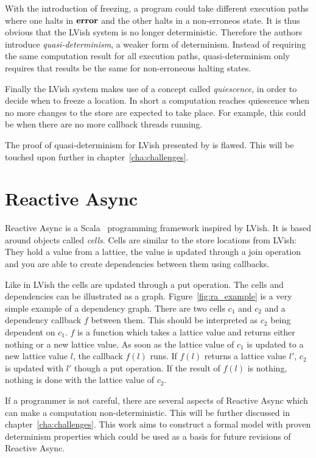 With the introduction of freezing, a program could take different execution
paths where one halts in $\mbox{{\bf error}}$ and the other halts in a non-erroneos state.
It is thus obvious that the LVish system is no longer deterministic. Therefore
the authors introduce \emph{quasi-determinism}, a weaker form of
determinism. Instead of requiring the same computation result for all execution
paths, quasi-determinism only requires that results be the same for
non-erroneous halting states.

Finally the LVish system makes use of a concept called \emph{quiescence}, in
order to decide when to freeze a location. In short a computation reaches
quiescence when no more changes to the store are expected to take place. For
example, this could be when there are no more callback threads running.

The proof of quasi-determinism for LVish presented by
\textcite{kuper2014freezeTR} is flawed. This will be touched upon further in
chapter~\ref{cha:challenges}.


\section{Reactive Async}\label{sec:reactive_async}

Reactive Async is a Scala~\parencite{} programming framework inspired by LVish. It is based
around objects called \emph{cells}.  Cells are similar to the store locations
from LVish: They hold a value from a lattice, the value is updated through a
join operation and you are able to create dependencies between them using
callbacks.

Like in LVish the cells are updated through a put operation.  The cells and
dependencies can be illustrated as a graph.  Figure~\ref{fig:ra_example} is a
very simple example of a dependency graph.  There are two cells $c_1$ and $c_2$
and a dependency callback $f$ between them. This should be interpreted as $c_2$
being dependent on $c_1$.  $f$ is a function which takes a lattice value and
returns either nothing or a new lattice value.  As soon as the lattice value of
$c_1$ is updated to a new lattice value $l$, the callback $f(l)$ runs. If $f(l)$
returns a lattice value $l'$, $c_2$ is updated with $l'$ though a put operation.
If the result of $f(l)$ is nothing, nothing is done with the lattice value of
$c_2$.

If a programmer is not careful, there are several aspects of Reactive Async
which can make a computation non-deterministic. This will be further discussed
in chapter~\ref{cha:challenges}. This work aims to construct a formal model with
proven determinism properties which could be used as a basis for future
revisions of Reactive Async.

